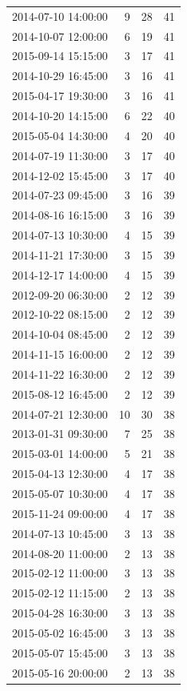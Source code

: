 \begin{tabular}{lrrr}
2014-07-10 14:00:00 & 9 & 28 & 41 \\
2014-10-07 12:00:00 & 6 & 19 & 41 \\
2015-09-14 15:15:00 & 3 & 17 & 41 \\
2014-10-29 16:45:00 & 3 & 16 & 41 \\
2015-04-17 19:30:00 & 3 & 16 & 41 \\
2014-10-20 14:15:00 & 6 & 22 & 40 \\
2015-05-04 14:30:00 & 4 & 20 & 40 \\
2014-07-19 11:30:00 & 3 & 17 & 40 \\
2014-12-02 15:45:00 & 3 & 17 & 40 \\
2014-07-23 09:45:00 & 3 & 16 & 39 \\
2014-08-16 16:15:00 & 3 & 16 & 39 \\
2014-07-13 10:30:00 & 4 & 15 & 39 \\
2014-11-21 17:30:00 & 3 & 15 & 39 \\
2014-12-17 14:00:00 & 4 & 15 & 39 \\
2012-09-20 06:30:00 & 2 & 12 & 39 \\
2012-10-22 08:15:00 & 2 & 12 & 39 \\
2014-10-04 08:45:00 & 2 & 12 & 39 \\
2014-11-15 16:00:00 & 2 & 12 & 39 \\
2014-11-22 16:30:00 & 2 & 12 & 39 \\
2015-08-12 16:45:00 & 2 & 12 & 39 \\
2014-07-21 12:30:00 & 10 & 30 & 38 \\
2013-01-31 09:30:00 & 7 & 25 & 38 \\
2015-03-01 14:00:00 & 5 & 21 & 38 \\
2015-04-13 12:30:00 & 4 & 17 & 38 \\
2015-05-07 10:30:00 & 4 & 17 & 38 \\
2015-11-24 09:00:00 & 4 & 17 & 38 \\
2014-07-13 10:45:00 & 3 & 13 & 38 \\
2014-08-20 11:00:00 & 2 & 13 & 38 \\
2015-02-12 11:00:00 & 3 & 13 & 38 \\
2015-02-12 11:15:00 & 2 & 13 & 38 \\
2015-04-28 16:30:00 & 3 & 13 & 38 \\
2015-05-02 16:45:00 & 3 & 13 & 38 \\
2015-05-07 15:45:00 & 3 & 13 & 38 \\
2015-05-16 20:00:00 & 2 & 13 & 38 \\

\end{tabular}
